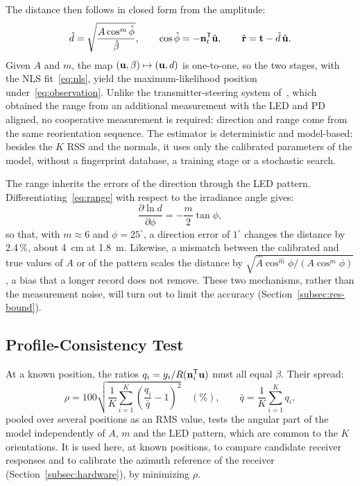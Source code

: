 The distance then follows in closed form from the amplitude:
\begin{equation}
 \hat d=\sqrt{\frac{A\cos^{m}\hat\phi}{\hat\beta}},\qquad
 \cos\hat\phi=-\mathbf{n}_t^{\mathsf T}\hat{\mathbf{u}},\qquad
 \hat{\mathbf{r}}=\mathbf{t}-\hat d\,\hat{\mathbf{u}}.
 \label{eq:range}
\end{equation}
Given $A$ and $m$, the map $(\mathbf{u},\beta)\mapsto(\mathbf{u},d)$ is one-to-one, so the two stages, with the NLS fit~\eqref{eq:nls}, yield the maximum-likelihood position under~\eqref{eq:observation}. Unlike the transmitter-steering system of~\cite{Acuna2026}, which obtained the range from an additional measurement with the LED and PD aligned, no cooperative measurement is required: direction and range come from the same reorientation sequence. The estimator is deterministic and model-based: besides the $K$ RSS and the normals, it uses only the calibrated parameters of the model, without a fingerprint database, a training stage or a stochastic search.

The range inherits the errors of the direction through the LED pattern. Differentiating~\eqref{eq:range} with respect to the irradiance angle gives:
\begin{equation}
 \frac{\partial\ln d}{\partial\phi}=-\frac{m}{2}\tan\phi,
 \label{eq:range-sensitivity}
\end{equation}
so that, with $m\approx6$ and $\phi=25^\circ$, a direction error of $1^\circ$ changes the distance by 2.4\,\%, about 4~cm at 1.8~m. Likewise, a mismatch between the calibrated and true values of $A$ or of the pattern scales the distance by $\sqrt{\hat A\cos^{\hat m}\phi/(A\cos^{m}\phi)}$, a bias that a longer record does not remove. These two mechanisms, rather than the measurement noise, will turn out to limit the accuracy (Section~\ref{subsec:res-bound}).

\subsection{Profile-Consistency Test}
\label{subsec:shape}
At a known position, the ratios $q_i=y_i/R(\mathbf{n}_i^{\mathsf T}\mathbf{u})$ must all equal $\beta$. Their spread:
\begin{equation}
 \rho=100\sqrt{\frac1K\sum_{i=1}^{K}\left(\frac{q_i}{\bar q}-1\right)^2}\quad(\%),\qquad
 \bar q=\frac1K\sum_{i=1}^{K}q_i,
 \label{eq:shape}
\end{equation}
pooled over several positions as an RMS value, tests the angular part of the model independently of $A$, $m$ and the LED pattern, which are common to the $K$ orientations. It is used here, at known positions, to compare candidate receiver responses and to calibrate the azimuth reference of the receiver (Section~\ref{subsec:hardware}), by minimizing $\rho$.

